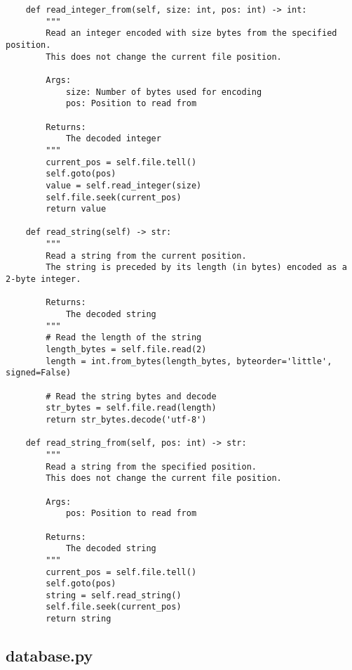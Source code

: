 \documentclass[utf8]{article}
\begin{document}
\begin{verbatim}
    def read_integer_from(self, size: int, pos: int) -> int:
        """
        Read an integer encoded with size bytes from the specified position.
        This does not change the current file position.
        
        Args:
            size: Number of bytes used for encoding
            pos: Position to read from
            
        Returns:
            The decoded integer
        """
        current_pos = self.file.tell()
        self.goto(pos)
        value = self.read_integer(size)
        self.file.seek(current_pos)
        return value
    
    def read_string(self) -> str:
        """
        Read a string from the current position.
        The string is preceded by its length (in bytes) encoded as a 2-byte integer.
        
        Returns:
            The decoded string
        """
        # Read the length of the string
        length_bytes = self.file.read(2)
        length = int.from_bytes(length_bytes, byteorder='little', signed=False)
        
        # Read the string bytes and decode
        str_bytes = self.file.read(length)
        return str_bytes.decode('utf-8')
    
    def read_string_from(self, pos: int) -> str:
        """
        Read a string from the specified position.
        This does not change the current file position.
        
        Args:
            pos: Position to read from
            
        Returns:
            The decoded string
        """
        current_pos = self.file.tell()
        self.goto(pos)
        string = self.read_string()
        self.file.seek(current_pos)
        return string 
\end{verbatim}

\subsection{database.py}
\end{document}
